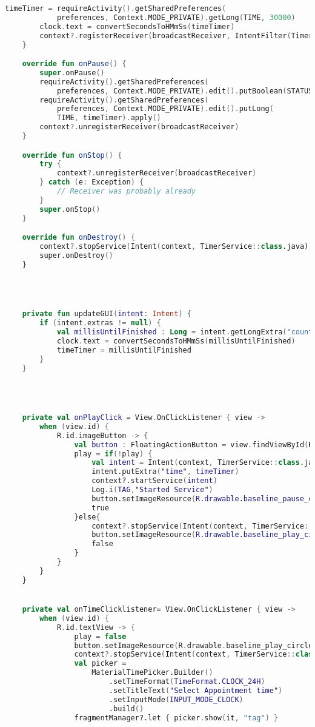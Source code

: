 \begin{lstlisting}[language=Kotlin, caption=\leftline{TimerFragment}, label=lst:TimerFragment]
        timeTimer = requireActivity().getSharedPreferences(
            preferences, Context.MODE_PRIVATE).getLong(TIME, 30000)
        clock.text = convertSecondsToHMmSs(timeTimer)
        context?.registerReceiver(broadcastReceiver, IntentFilter(TimerService.COUNTDOWN_BR))
    }

    override fun onPause() {
        super.onPause()
        requireActivity().getSharedPreferences(
            preferences, Context.MODE_PRIVATE).edit().putBoolean(STATUS, play).apply()
        requireActivity().getSharedPreferences(
            preferences, Context.MODE_PRIVATE).edit().putLong(
            TIME, timeTimer).apply()
        context?.unregisterReceiver(broadcastReceiver)
    }

    override fun onStop() {
        try {
            context?.unregisterReceiver(broadcastReceiver)
        } catch (e: Exception) {
            // Receiver was probably already
        }
        super.onStop()
    }

    override fun onDestroy() {
        context?.stopService(Intent(context, TimerService::class.java))
        super.onDestroy()
    }




    private fun updateGUI(intent: Intent) {
        if (intent.extras != null) {
            val millisUntilFinished : Long = intent.getLongExtra("countdown", 30000)
            clock.text = convertSecondsToHMmSs(millisUntilFinished)
            timeTimer = millisUntilFinished
        }
    }




    private val onPlayClick = View.OnClickListener { view ->
        when (view.id) {
            R.id.imageButton -> {
                val button : FloatingActionButton = view.findViewById(R.id.imageButton)
                play = if(!play) {
                    val intent = Intent(context, TimerService::class.java)
                    intent.putExtra("time", timeTimer)
                    context?.startService(intent)
                    Log.i(TAG,"Started Service")
                    button.setImageResource(R.drawable.baseline_pause_circle_outline)
                    true
                }else{
                    context?.stopService(Intent(context, TimerService::class.java))
                    button.setImageResource(R.drawable.baseline_play_circle_outline)
                    false
                }
            }
        }
    }


    private val onTimeClicklistener= View.OnClickListener { view ->
        when (view.id) {
            R.id.textView -> {
                play = false
                button.setImageResource(R.drawable.baseline_play_circle_outline)
                context?.stopService(Intent(context, TimerService::class.java))
                val picker =
                    MaterialTimePicker.Builder()
                        .setTimeFormat(TimeFormat.CLOCK_24H)
                        .setTitleText("Select Appointment time")
                        .setInputMode(INPUT_MODE_CLOCK)
                        .build()
                fragmentManager?.let { picker.show(it, "tag") }


\end{lstlisting}
